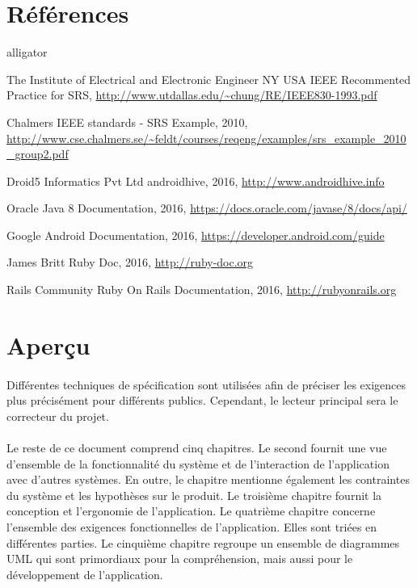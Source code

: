\documentclass[titlepage, 12pt]{report}
\begin{document}
\section{Références}
\begin{labeling}{alligator}
	\item [The Institute of Electrical and Electronic Engineer NY USA] IEEE Recommented Practice for SRS, \url{http://www.utdallas.edu/~chung/RE/IEEE830-1993.pdf}
	\item [Chalmers] IEEE standards - SRS Example, 2010, \url{http://www.cse.chalmers.se/~feldt/courses/reqeng/examples/srs_example_2010_group2.pdf}
	\item [Droid5 Informatics Pvt Ltd] androidhive, 2016, \url{http://www.androidhive.info}
	\item [Oracle] Java 8 Documentation, 2016, \url{https://docs.oracle.com/javase/8/docs/api/}
	\item [Google] Android Documentation, 2016, \url{https://developer.android.com/guide}
	\item [James Britt] Ruby Doc, 2016, \url{http://ruby-doc.org}
	\item [Rails Community] Ruby On Rails Documentation, 2016, \url{http://rubyonrails.org}
\end{labeling}

\section{Aperçu}

\paragraph{}Différentes techniques de spécification sont utilisées afin de préciser les exigences plus précisément pour différents publics. Cependant, le lecteur principal sera le correcteur du projet.

\paragraph{}Le reste de ce document comprend cinq chapitres. Le second fournit une vue d'ensemble de la fonctionnalité du système et de l'interaction de l'application avec d'autres systèmes. En outre, le chapitre mentionne également les contraintes du système et les hypothèses sur le produit.
Le troisième chapitre fournit la conception et l'ergonomie de l'application.
Le quatrième chapitre concerne l'ensemble des exigences fonctionnelles de l'application. Elles sont triées en différentes parties.
Le cinquième chapitre regroupe un ensemble de diagrammes UML qui sont primordiaux pour la compréhension, mais aussi pour le développement de l'application.
\end{document}
